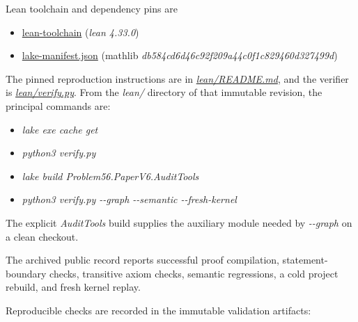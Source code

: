 \documentclass[11pt,a4paper]{article}
\providecommand{\tightlist}{\setlength{\itemsep}{0pt}\setlength{\parskip}{0pt}}
\begin{document}
Lean toolchain and dependency pins are

\begin{itemize}
\tightlist
\item
  \href{https://github.com/yuningyang19/OpenProblemsInNLA_TR-01/blob/ed21181197ac839eac95f549404f94e7e3aa6e10/lean/lean-toolchain}{lean-toolchain}
  (\textit{lean 4.33.0})
\item
  \href{https://github.com/yuningyang19/OpenProblemsInNLA_TR-01/blob/ed21181197ac839eac95f549404f94e7e3aa6e10/lean/lake-manifest.json}{lake-manifest.json}
  (mathlib \textit{db584cd6d46c92f209a44c0f1c829460d327499d})
\end{itemize}

The pinned reproduction instructions are in
\href{https://github.com/yuningyang19/OpenProblemsInNLA_TR-01/blob/ed21181197ac839eac95f549404f94e7e3aa6e10/lean/README.md}{\textit{lean/README.md}},
and the verifier is
\href{https://github.com/yuningyang19/OpenProblemsInNLA_TR-01/blob/ed21181197ac839eac95f549404f94e7e3aa6e10/lean/verify.py}{\textit{lean/verify.py}}.
From the \textit{lean/} directory of that immutable revision, the
principal commands are:

\begin{itemize}
\tightlist
\item
  \textit{lake exe cache get}
\item
  \textit{python3 verify.py}
\item
  \textit{lake build Problem56.PaperV6.AuditTools}
\item
  \textit{python3 verify.py -\/-graph -\/-semantic -\/-fresh-kernel}
\end{itemize}

The explicit \textit{AuditTools} build supplies the auxiliary module
needed by \textit{-\/-graph} on a clean checkout.

The archived public record reports successful proof compilation,
statement-boundary checks, transitive axiom checks, semantic
regressions, a cold project rebuild, and fresh kernel replay.

Reproducible checks are recorded in the immutable validation artifacts:
\end{document}
